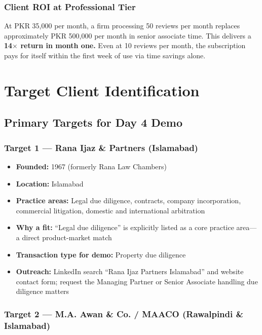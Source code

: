 \documentclass[12pt, a4paper]{article}
\begin{document}
\subsubsection{Client ROI at Professional Tier}

At PKR 35,000 per month, a firm processing 50 reviews per month replaces
approximately PKR 500,000 per month in senior associate time. This delivers a
\textbf{14$\times$ return in month one.} Even at 10 reviews per month, the
subscription pays for itself within the first week of use via time savings alone.

\section{Target Client Identification}

\subsection{Primary Targets for Day 4 Demo}

\subsubsection{Target 1 --- Rana Ijaz \& Partners (Islamabad)}

\begin{itemize}[leftmargin=1.5cm]
    \item \textbf{Founded:} 1967 (formerly Rana Law Chambers)
    \item \textbf{Location:} Islamabad
    \item \textbf{Practice areas:} Legal due diligence, contracts, company
    incorporation, commercial litigation, domestic and international arbitration
    \item \textbf{Why a fit:} ``Legal due diligence'' is explicitly listed as a
    core practice area---a direct product-market match
    \item \textbf{Transaction type for demo:} Property due diligence
    \item \textbf{Outreach:} LinkedIn search ``Rana Ijaz Partners Islamabad'' and
    website contact form; request the Managing Partner or Senior Associate
    handling due diligence matters
\end{itemize}

\subsubsection{Target 2 --- M.A. Awan \& Co. / MAACO (Rawalpindi \& Islamabad)}
\end{document}

